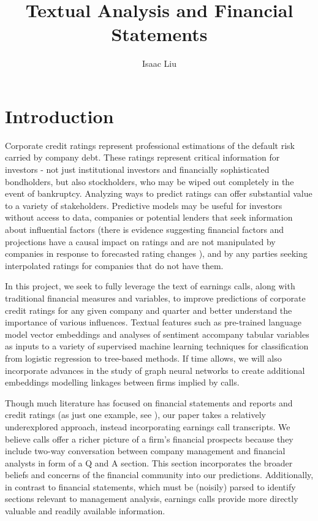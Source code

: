 \documentclass{article}[11pt]
\title{Textual Analysis and Financial Statements}
\author{Isaac Liu}
\begin{document}
	\maketitle

    \section*{Introduction}

    Corporate credit ratings represent professional estimations of the default risk carried by company debt. These ratings represent critical information for investors - not just institutional investors and financially sophisticated bondholders, but also stockholders, who may be wiped out completely in the event of bankruptcy. Analyzing ways to predict ratings can offer substantial value to a variety of stakeholders. Predictive models may be useful for investors without access to data, companies or potential lenders that seek information about influential factors (there is evidence suggesting financial factors and projections have a causal impact on ratings and are not manipulated by companies in response to forecasted rating changes \citep{he_impact_2018}), and by any parties seeking interpolated ratings for companies that do not have them.

    In this project, we seek to fully leverage the text of earnings calls, along with traditional financial measures and variables, to improve predictions of corporate credit ratings for any given company and quarter and better understand the importance of various influences. Textual features such as pre-trained language model vector embeddings \citep{araci_finbert_2019} and analyses of sentiment accompany tabular variables as inputs to a variety of supervised machine learning techniques for classification from logistic regression to tree-based methods. If time allows, we will also incorporate advances in the study of graph neural networks to create additional embeddings modelling linkages between firms \citep{das_credit_2023} implied by calls.

    Though much literature has focused on financial statements and reports and credit ratings (as just one example, see \cite{makwana_understanding_2022}), our paper takes a relatively underexplored approach, instead incorporating earnings call transcripts. We believe calls offer a richer picture of a firm's financial prospects because they include two-way conversation between company management and financial analysts in form of a Q and A section. This section incorporates the broader beliefs and concerns of the financial community into our predictions. Additionally, in contrast to financial statements, which must be (noisily) parsed to identify sections relevant to management analysis, earnings calls provide more directly valuable and readily available information. %
\end{document}
